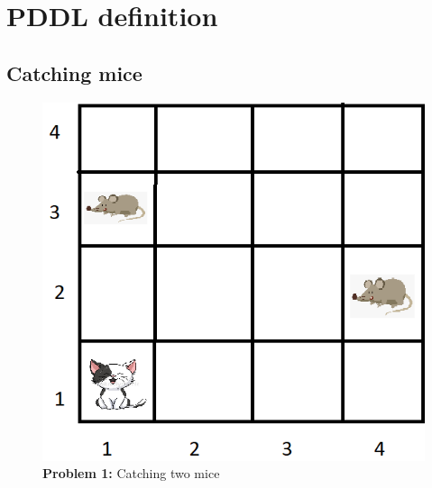 \section{PDDL definition}
\label{sec:pddl}

\subsection{Catching mice}



\begin{multicols}{2}

\begin{figure}[H]
    \centering
    \includegraphics[width=\linewidth]{fig/A3/cat_01.png}
    \caption{\textbf{Problem 1:} Catching two mice}
    \label{fig:cat_01}
\end{figure}

\columnbreak


\end{multicols}
